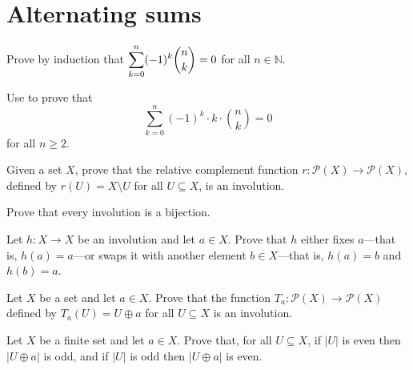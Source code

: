 \section{Alternating sums}

\begin{exercise}
Prove by induction that $\displaystyle \sum_{k=0}^n (-1)^k \dbinom{n}{k} = 0$ for all $n \in \mathbb{N}$.
\end{exercise}


\begin{exercise}
\label{exAlternatingSumOfKTimesBinomialCoefficientByPrimitiveInvolutionPrinciple}
Use  to prove that
\[ \displaystyle \sum_{k=0}^n (-1)^k \cdot k \cdot \binom{n}{k} = 0 \]
for all $n \ge 2$.
\end{exercise}


\begin{exercise}
Given a set $X$, prove that the relative complement function $r : \mathcal{P}(X) \to \mathcal{P}(X)$, defined by $r(U) = X \setminus U$ for all $U \subseteq X$, is an involution.
\end{exercise}

\begin{exercise}
Prove that every involution is a bijection.
\end{exercise}

\begin{exercise}
Let $h : X \to X$ be an involution and let $a \in X$. Prove that $h$ either fixes $a$---that is, $h(a)=a$---or swaps it with another element $b \in X$---that is, $h(a)=b$ and $h(b)=a$.
\end{exercise}



\begin{exercise}
\label{exToggleIsInvolution}
Let $X$ be a set and let $a \in X$. Prove that the function $T_a : \mathcal{P}(X) \to \mathcal{P}(X)$ defined by $T_a(U) = U \oplus a$ for all $U \subseteq X$ is an involution.
\end{exercise}

\begin{exercise}
\label{exToggleSwapsParity}
Let $X$ be a finite set and let $a \in X$. Prove that, for all $U \subseteq X$, if $|U|$ is even then $|U \oplus a|$ is odd, and if $|U|$ is odd then $|U \oplus a|$ is even.
\end{exercise}


